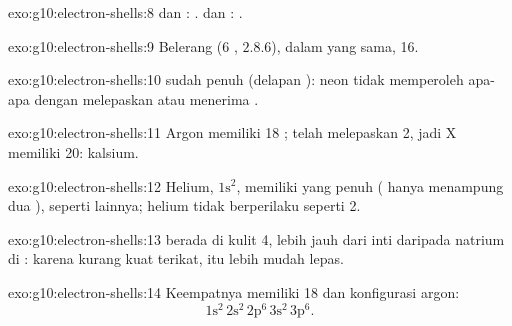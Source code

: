 \begin{solution}{exo:g10:electron-shells:8}
 dan : .  dan :
.
\end{solution}

\begin{solution}{exo:g10:electron-shells:9}
Belerang (6 , $2.8.6$), dalam  yang sama, 16.
\end{solution}

\begin{solution}{exo:g10:electron-shells:10}
 sudah penuh (delapan ): neon tidak memperoleh
apa-apa dengan melepaskan atau menerima .
\end{solution}

\begin{solution}{exo:g10:electron-shells:11}
Argon memiliki 18 ;  telah melepaskan 2, jadi X
memiliki 20: kalsium.
\end{solution}

\begin{solution}{exo:g10:electron-shells:12}
Helium, $1\mathrm{s}^2$, memiliki  yang penuh ( hanya
menampung dua ), seperti  lainnya; helium tidak
berperilaku seperti   2.
\end{solution}

\begin{solution}{exo:g10:electron-shells:13}
 berada di kulit 4, lebih jauh dari inti daripada
 natrium di : karena kurang kuat terikat,
 itu lebih mudah lepas.
\end{solution}

\begin{solution}{exo:g10:electron-shells:14}
Keempatnya memiliki 18  dan konfigurasi argon:
\[ 1\mathrm{s}^2\,2\mathrm{s}^2\,2\mathrm{p}^6\,3\mathrm{s}^2\,3\mathrm{p}^6. \]
\end{solution}


